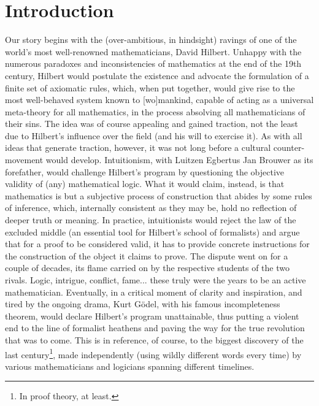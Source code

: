 \chapter{Introduction}
\label{chapter:Introduction}


Our story begins with the (over-ambitious, in hindsight) ravings of one of the world's most well-renowned mathematicians, David Hilbert. 
Unhappy with the numerous paradoxes and inconsistencies of mathematics at the end of the 19th century, Hilbert would postulate the existence and advocate the formulation of a finite set of axiomatic rules, which, when put together, would give rise to the most well-behaved system known to [wo]mankind, capable of acting as a universal meta-theory for all mathematics, in the process absolving all mathematicians of their sins.
The idea was of course appealing and gained traction, not the least due to Hilbert's influence over the field (and his will to exercise it).
As with all ideas that generate traction, however, it was not long before a cultural counter-movement would develop.
Intuitionism, with Luitzen Egbertus Jan Brouwer as its forefather, would challenge Hilbert's program by questioning the objective validity of (any) mathematical logic.
What it would claim, instead, is that mathematics is but a subjective process of construction that abides by some rules of inference, which, internally consistent as they may be, hold no reflection of deeper truth or meaning.
In practice, intuitionists would reject the law of the excluded middle (an essential tool for Hilbert's school of formalists) and argue that for a proof to be considered valid, it has to provide concrete instructions for the construction of the object it claims to prove.
The dispute went on for a couple of decades, its flame carried on by the respective students of the two rivals.
Logic, intrigue, conflict, fame...  these truly were the years to be an active mathematician.
Eventually, in a critical moment of clarity and inspiration, and tired by the ongoing drama, Kurt G\"odel, with his famous incompleteness theorem, would declare Hilbert's program unattainable, thus putting a violent end to the line of formalist heathens and paving the way for the true revolution that was to come.
This is in reference, of course, to the biggest discovery of the last century\footnote{In proof theory, at least.}, made independently (using wildly different words every time) by various mathematicians and logicians spanning different timelines.
